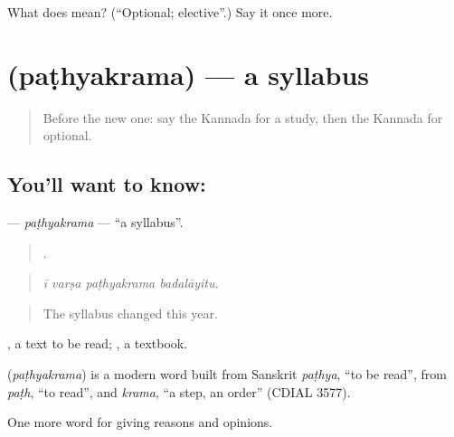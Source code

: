 \begin{tcolorbox}[breakable,colback=teal!4,colframe=teal!35!black,title={Before you move on}]
What does  mean? (\textquotedblleft{}Optional; elective\textquotedblright{}.) Say it once more.
\end{tcolorbox}
\section[\texorpdfstring{\kn{ಪಠ್ಯಕ್ರಮ} (paṭhyakrama)}{ಪಠ್ಯಕ್ರಮ (paṭhyakrama)}]{ (paṭhyakrama) — a syllabus}

\label{lesson:KA-C408-pathyakrama}



\begin{quote}
Before the new one: say the Kannada for a study, then the Kannada for optional.
\end{quote}

\subsection*{You'll want to know: }
\textbf{} — \emph{paṭhyakrama} — \textquotedblleft{}a syllabus\textquotedblright{}.

\begin{quote}
   .
\end{quote}

\begin{quote}
\emph{ī varṣa paṭhyakrama badalāyitu.}
\end{quote}

\begin{quote}
The syllabus changed this year.
\end{quote}

, a text to be read; , a textbook.

\begin{cousinweb}
\textbf{} (\emph{paṭhyakrama}) is a modern word built from Sanskrit \emph{paṭhya}, \textquotedblleft{}to be read\textquotedblright{}, from \emph{paṭh}, \textquotedblleft{}to read\textquotedblright{}, and \emph{krama}, \textquotedblleft{}a step, an order\textquotedblright{} (CDIAL 3577).
\end{cousinweb}

\begin{grammarlens}[title={What you've built}]
One more word for giving reasons and opinions.
\end{grammarlens}

